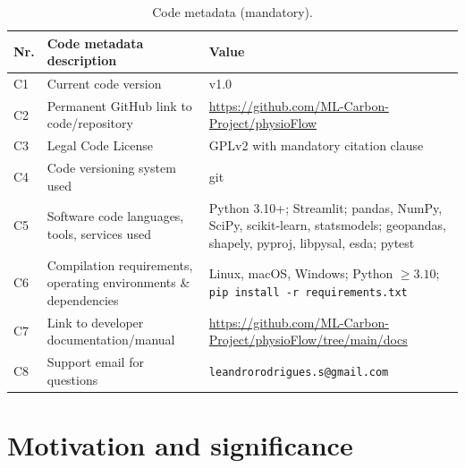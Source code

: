 \documentclass[preprint,12pt,a4paper]{elsarticle}
\begin{document}
\begin{table}[!h]
\centering
\footnotesize
\begin{tabular}{|l|p{4.5cm}|p{6.5cm}|}
\hline
\textbf{Nr.} & \textbf{Code metadata description} & \textbf{Value} \\
\hline
C1 & Current code version & v1.0 \\
\hline
C2 & Permanent GitHub link to code/repository & \url{https://github.com/ML-Carbon-Project/physioFlow} \\
\hline
C3 & Legal Code License & GPLv2 with mandatory citation clause \\
\hline
C4 & Code versioning system used & git \\
\hline
C5 & Software code languages, tools, services used & Python 3.10+; Streamlit; pandas, NumPy, SciPy, scikit-learn, statsmodels; geopandas, shapely, pyproj, libpysal, esda; pytest \\
\hline
C6 & Compilation requirements, operating environments \& dependencies & Linux, macOS, Windows; Python $\geq 3.10$; \texttt{pip install -r requirements.txt} \\
\hline
C7 & Link to developer documentation/manual & \url{https://github.com/ML-Carbon-Project/physioFlow/tree/main/docs} \\
\hline
C8 & Support email for questions & \texttt{leandrorodrigues.s@gmail.com} \\
\hline
\end{tabular}
\caption{Code metadata (mandatory).}
\label{tbl:metadata}
\end{table}

\section{Motivation and significance}\label{sec:intro}
\end{document}
